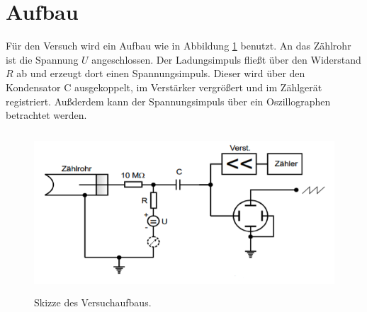 \section{Aufbau}
\label{sec:Aufbau}


Für den Versuch wird ein Aufbau wie in Abbildung \ref{fig:Aufbau} benutzt.
An das Zählrohr ist die Spannung $U$ angeschlossen.
Der Ladungsimpuls fließt über den Widerstand $R$ ab und erzeugt dort einen Spannungsimpuls.
Dieser wird über den Kondensator C ausgekoppelt, im Verstärker vergrößert und im Zählgerät registriert.
Außderdem kann der Spannungsimpuls über ein Oszillographen betrachtet werden.
\begin{figure}
  \centering
  \includegraphics[height=6cm]{data/Aufbau.png}
  \caption{Skizze des Versuchaufbaus. \cite{V703}}
  \label{fig:Aufbau}
\end{figure}

